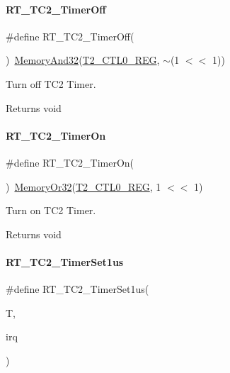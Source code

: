 \paragraph{\texorpdfstring{R\+T\+\_\+\+T\+C2\+\_\+\+Timer\+Off}{RT\_TC2\_TimerOff}}
{\footnotesize\ttfamily \#define R\+T\+\_\+\+T\+C2\+\_\+\+Timer\+Off(\begin{DoxyParamCaption}{ }\end{DoxyParamCaption})~\mbox{\hyperlink{a00026_ad87cedffcaadc51db22594fce55173d4}{Memory\+And32}}(\mbox{\hyperlink{a00026_a5853553391e986211306d4f29ab31e47}{T2\+\_\+\+C\+T\+L0\+\_\+\+R\+EG}}, $\sim$(1 $<$$<$ 1))}



Turn off T\+C2 Timer. 

\begin{DoxyReturn}{Returns}
void 
\end{DoxyReturn}
\mbox{\label{a00083_ab274ee44af2080d68745b2ec3af06648}} 
\paragraph{\texorpdfstring{R\+T\+\_\+\+T\+C2\+\_\+\+Timer\+On}{RT\_TC2\_TimerOn}}
{\footnotesize\ttfamily \#define R\+T\+\_\+\+T\+C2\+\_\+\+Timer\+On(\begin{DoxyParamCaption}{ }\end{DoxyParamCaption})~\mbox{\hyperlink{a00026_a27874a97deab7cecdde5ddecf466e31e}{Memory\+Or32}}(\mbox{\hyperlink{a00026_a5853553391e986211306d4f29ab31e47}{T2\+\_\+\+C\+T\+L0\+\_\+\+R\+EG}}, 1 $<$$<$ 1)}



Turn on T\+C2 Timer. 

\begin{DoxyReturn}{Returns}
void 
\end{DoxyReturn}
\mbox{\label{a00083_a005265e28d070ee73720939fca9a815a}} 
\paragraph{\texorpdfstring{R\+T\+\_\+\+T\+C2\+\_\+\+Timer\+Set1us}{RT\_TC2\_TimerSet1us}}
{\footnotesize\ttfamily \#define R\+T\+\_\+\+T\+C2\+\_\+\+Timer\+Set1us(\begin{DoxyParamCaption}\item[{}]{T,  }\item[{}]{irq }\end{DoxyParamCaption})}

